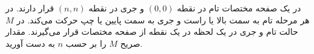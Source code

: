 \EXERCISE
در یک صفحه مختصات تام در نقطه
$(0, 0)$
و جری در نقطه
$(n, n)$
قرار دارند. در هر مرحله تام به سمت بالا یا راست و جری به سمت پایین یا چپ حرکت می‌کند. در
$M$
حالت تام و جری در یک لحظه در یک نقطه از صفحه مختصات قرار می‌گیرند. مقدار صریح
$M$
را بر حسب
$n$
به دست آورید.